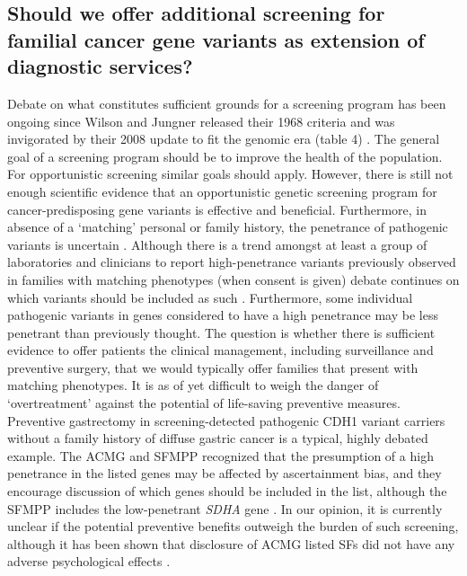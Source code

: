 \subsection[Should we offer screening to extend diagnostic services?]{Should we offer additional screening for familial cancer gene variants as extension of diagnostic services?}
Debate on what constitutes sufficient grounds for a screening program has been ongoing since Wilson and Jungner released their 1968 criteria and was invigorated by their 2008 update to fit the genomic era (table 4) \cite{Andermann_2008}. %
The general goal of a screening program should be to improve the health of the population. For opportunistic screening similar goals should apply. 
However, there is still not enough scientific evidence that an opportunistic genetic screening program for cancer-predisposing gene variants is effective and beneficial. Furthermore, in absence of a ‘matching’ personal or family history, the penetrance of pathogenic variants is uncertain \cite{Brothers_2019}. 
Although there is a trend amongst at least a group of laboratories and clinicians to report high-penetrance variants previously observed in families with matching phenotypes (when consent is given) debate continues on which variants should be included as such \cite{Pujol_2018,Shkedi_Rafid_2014,Braverman_2018}. 
Furthermore, some individual pathogenic variants in genes considered to have a high penetrance may be less penetrant than previously thought. 
The question is whether there is sufficient evidence to offer patients the clinical management, including surveillance and preventive surgery, that we would typically offer families that present with matching phenotypes. It is as of yet difficult to weigh the danger of ‘overtreatment’ against the potential of life-saving preventive measures. 
Preventive gastrectomy in screening-detected pathogenic CDH1 variant carriers without a family history of diffuse gastric cancer is a typical, highly debated example. 
The ACMG and SFMPP recognized that the presumption of a high penetrance in the listed genes may be affected by ascertainment bias, and they encourage discussion of which genes should be included in the list, although the SFMPP includes the low-penetrant \textsl{SDHA} gene \cite{Kalia_2016,Pujol_2018}. 
In our opinion, it is currently unclear if the potential preventive benefits outweigh the burden of such screening, although it has been shown that disclosure of ACMG listed SFs did not have any adverse psychological effects \cite{Olfson_2015}. 


